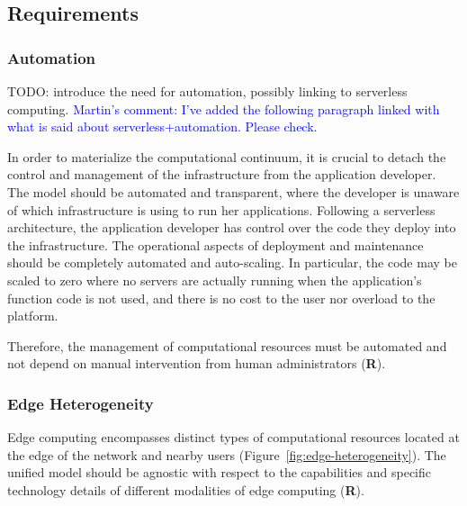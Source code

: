 \subsection{Requirements}\label{sec:requirements}


\subsubsection{Automation}


TODO: introduce the need for automation, possibly linking to serverless computing.
\textcolor{blue}{Martin's comment: I've added the following paragraph linked with what is said about serverless+automation. Please check.}

In order to materialize the computational continuum, it is crucial to detach the control and management of the infrastructure from the application developer. The model should be automated and transparent, where the developer is unaware of which infrastructure is using to run her applications. Following a serverless architecture, the application developer has control over the code they deploy into the infrastructure.  The operational aspects of deployment and maintenance should be completely automated and
auto-scaling. In particular, the code may be scaled to zero where no servers are actually running when the application's function code is not used, and there is no cost to the user nor overload to the platform.

Therefore, the management of computational resources must be automated and not depend on  manual intervention from human administrators (\textbf{R}).


\subsubsection{Edge Heterogeneity}


Edge computing encompasses distinct types of computational resources located at the edge of the network and nearby users (Figure~\ref{fig:edge-heterogeneity}). The unified model should be agnostic with respect to the capabilities and specific technology details of different modalities of edge computing (\textbf{R}).

